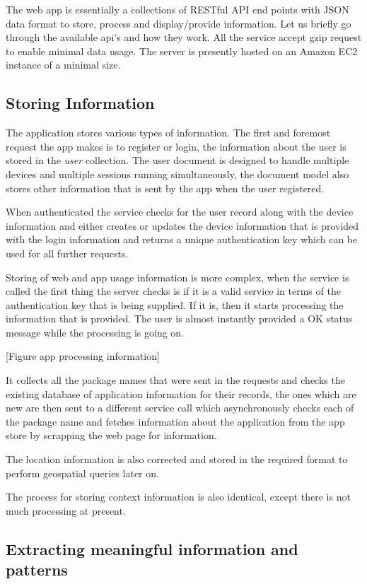 \documentclass[12pt]{report}
\begin{document}
The web app is essentially a collections of RESTful API end points with JSON data format to store, process and display/provide information. Let us briefly go through the available api's and how they work. All the service accept gzip request to enable minimal data usage. The server is presently hosted on an Amazon EC2 instance of a minimal size.

\subsection{Storing Information}

The application stores various types of information. The first and foremost request the app makes is to register or login, the information about the user is stored in the \textit{user} collection. The user document is designed to handle multiple devices and multiple sessions running simultaneously, the document model also stores other information that is sent by the app when the user registered.

When authenticated the service checks for the user record along with the device information and either creates or updates the device information that is provided with the login information and returns a unique authentication key which can be used for all further requests.

Storing of web and app usage information is more complex, when the service is called the first thing the server checks is if it is a valid service in terms of the authentication key that is being supplied. If it is, then it starts processing the information that is provided. The user is almost instantly provided a OK status message while the processing is going on.

[Figure app processing information]

 It collects all the package names that were sent in the requests and checks the existing database of application information for their records, the ones which are new are then sent to a different service call which asynchronously checks each of the package name and fetches information about the application from the app store by scrapping the web page for information.
 
The location information is also corrected and stored in the required format to perform geospatial queries later on.

The process for storing context information is also identical, except there is not much processing at present.

\subsection{Extracting meaningful information and patterns}
\end{document}
